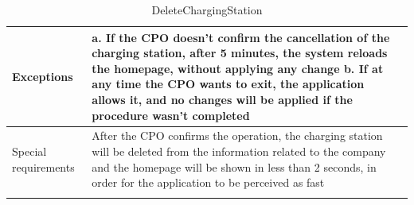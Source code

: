 \begin{center}
\begin{longtable}{p{4cm} p{11cm}}
     \hline
     Exceptions &   a. If the CPO doesn't confirm the cancellation of the charging station, after 5 minutes, the                    system reloads the homepage, without applying any change \newline
                    b. If at any time the CPO wants to exit, the application allows it, and no changes will be applied if the procedure wasn't completed \\
     \hline
     Special requirements & After the CPO confirms the operation, the charging station will be deleted from the information related to the company and the homepage will be shown in less than 2 seconds, in order for the application to be perceived as fast\\
     \hline
    \caption{DeleteChargingStation}
    \label{tab:DeleteChargingStation}
    \end{longtable}
\end{center}

